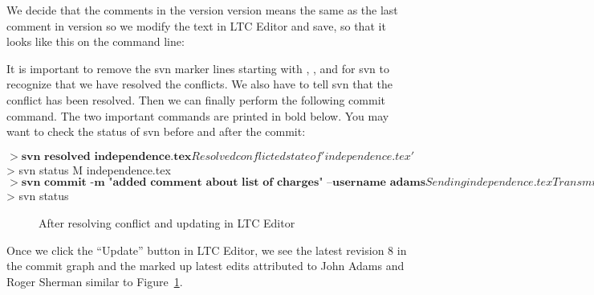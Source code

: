 We decide that the comments in the version  version means the same as the last comment in version  so we modify the text in LTC Editor and save, so that it looks like this on the command line:
It is important to remove the svn marker lines starting with \Code{<<<<<<<}, \Code{=======}, and \Code{>>>>>>>} for svn to recognize that we have resolved the conflicts. We also have to tell svn that the conflict has been resolved.  Then we can finally  perform the following commit command.  The two important commands are printed in bold below.  
You may want to check the status of svn before and after the commit:
\begin{CodeVerbatim}[commandchars=\\\{\}]
$> \textbf{svn resolved independence.tex}
Resolved conflicted state of 'independence.tex'
$> svn status
M       independence.tex
$> \textbf{svn commit -m "added comment about list of charges" --username adams}
Sending        independence.tex
Transmitting file data .
Committed revision 8.
$> svn status
\end{CodeVerbatim}
\begin{figure}
\centering
{}
\caption{After resolving conflict and updating in LTC Editor} \label{fig:svn-editor-merge-resolve}
\end{figure}
Once we click the ``Update'' button in LTC Editor, we see the latest revision 8 in the commit graph and the marked up latest edits attributed to John Adams and Roger Sherman similar to Figure~\ref{fig:svn-editor-merge-resolve}.
